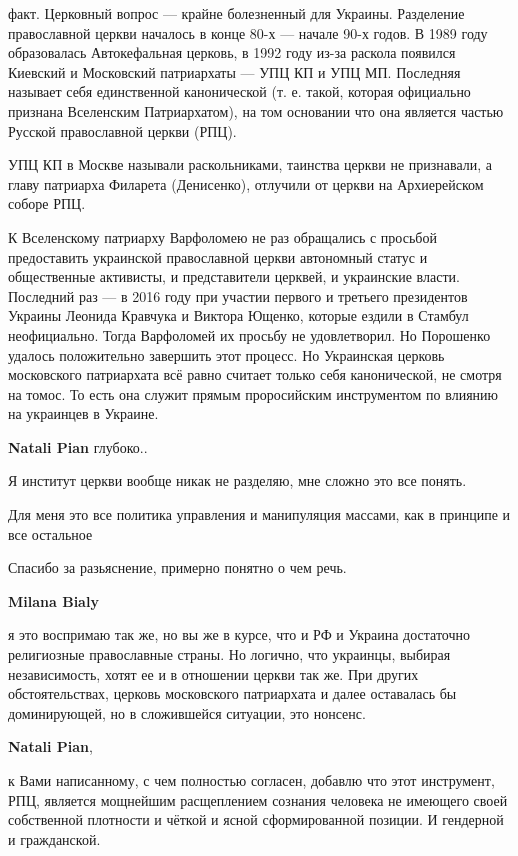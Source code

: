 \begin{itemize}
\begin{itemize}
факт. Церковный вопрос — крайне болезненный для Украины. Разделение
православной церкви началось в конце 80-х — начале 90-х годов. В 1989 году
образовалась Автокефальная церковь, в 1992 году из-за раскола появился Киевский
и Московский патриархаты — УПЦ КП и УПЦ МП. Последняя называет себя
единственной канонической (т. е. такой, которая официально признана Вселенским
Патриархатом), на том основании что она является частью Русской православной
церкви (РПЦ).

УПЦ КП в Москве называли раскольниками, таинства церкви не признавали, а главу
патриарха Филарета (Денисенко), отлучили от церкви на Архиерейском соборе РПЦ.

К Вселенскому патриарху Варфоломею не раз обращались с просьбой предоставить
украинской православной церкви автономный статус и общественные активисты, и
представители церквей, и украинские власти. Последний раз — в 2016 году при
участии первого и третьего президентов Украины Леонида Кравчука и Виктора
Ющенко, которые ездили в Стамбул неофициально. Тогда Варфоломей их просьбу не
удовлетворил. Но Порошенко удалось положительно завершить этот процесс. Но
Украинская церковь московского патриархата всё равно считает только себя
канонической, не смотря на томос. То есть она служит прямым проросийским
инструментом по влиянию на украинцев в Украине.

\textbf{Natali Pian} глубоко..

Я институт церкви вообще никак не разделяю, мне сложно это все понять.

Для меня это все политика управления и манипуляция массами, как в принципе и все остальное

Спасибо за разьяснение, примерно понятно о чем речь.

\textbf{Milana Bialy} 

я это воспримаю так же, но вы же в курсе, что и РФ и Украина достаточно
религиозные православные страны. Но логично, что украинцы, выбирая
независимость, хотят ее и в отношении церкви так же. При других
обстоятельствах, церковь московского патриархата и далее оставалась бы
доминирующей, но в сложившейся ситуации, это нонсенс.

\textbf{Natali Pian}, 

к Вами написанному, с чем полностью согласен, добавлю что этот инструмент, РПЦ,
является мощнейшим расщеплением сознания человека не имеющего своей собственной
плотности и чёткой и ясной сформированной позиции. И гендерной и гражданской.


\end{itemize}
\end{itemize}
